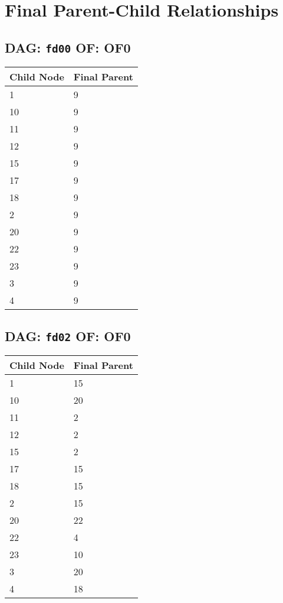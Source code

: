 \documentclass{article}
\begin{document}
\pagestyle{fancy}
\fancyhf{}
\section*{Final Parent-Child Relationships}
\subsection*{DAG: \texttt{fd00} OF: OF0}
\begin{tabular}{ll}
\toprule
\textbf{Child Node} & \textbf{Final Parent} \\
\midrule
1 & 9 \\
10 & 9 \\
11 & 9 \\
12 & 9 \\
15 & 9 \\
17 & 9 \\
18 & 9 \\
2 & 9 \\
20 & 9 \\
22 & 9 \\
23 & 9 \\
3 & 9 \\
4 & 9 \\
\bottomrule
\end{tabular}

\subsection*{DAG: \texttt{fd02} OF: OF0}
\begin{tabular}{ll}
\toprule
\textbf{Child Node} & \textbf{Final Parent} \\
\midrule
1 & 15 \\
10 & 20 \\
11 & 2 \\
12 & 2 \\
15 & 2 \\
17 & 15 \\
18 & 15 \\
2 & 15 \\
20 & 22 \\
22 & 4 \\
23 & 10 \\
3 & 20 \\
4 & 18 \\
\bottomrule
\end{tabular}
\end{document}

